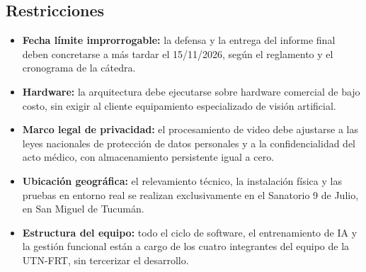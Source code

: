 \subsection{Restricciones}

\begin{itemize}
  \item \textbf{Fecha límite improrrogable:} la defensa y la entrega del informe final deben concretarse a más tardar el 15/11/2026, según el reglamento y el cronograma de la cátedra.
  \item \textbf{Hardware:} la arquitectura debe ejecutarse sobre hardware comercial de bajo costo, sin exigir al cliente equipamiento especializado de visión artificial.
  \item \textbf{Marco legal de privacidad:} el procesamiento de video debe ajustarse a las leyes nacionales de protección de datos personales y a la confidencialidad del acto médico, con almacenamiento persistente igual a cero.
  \item \textbf{Ubicación geográfica:} el relevamiento técnico, la instalación física y las pruebas en entorno real se realizan exclusivamente en el Sanatorio 9 de Julio, en San Miguel de Tucumán.
  \item \textbf{Estructura del equipo:} todo el ciclo de software, el entrenamiento de IA y la gestión funcional están a cargo de los cuatro integrantes del equipo de la UTN-FRT, sin tercerizar el desarrollo.
\end{itemize}
